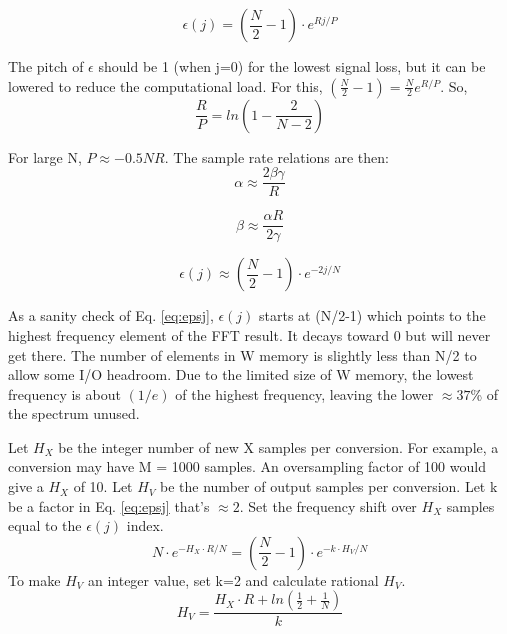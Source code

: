\begin{equation} \label{eq:eps_j}
\epsilon(j) = \left(\frac{N}{2}-1\right)\cdot e^{Rj/P}
\end{equation}

The pitch of $\epsilon$ should be 1 (when j=0) for the lowest signal loss,
but it can be lowered to reduce the computational load.
For this, $(\frac{N}{2}-1) = \frac{N}{2} e^{R/P}$. So,
\begin{equation} \label{eq:p}
\frac{R}{P} = ln\left(1 - \frac{2}{N-2}\right)
\end{equation}

For large N, $P \approx -0.5 NR$. The sample rate relations are then:
\begin{equation}
\alpha \approx \frac{2\beta\gamma}{R}
\end{equation}

\begin{equation}
\beta \approx \frac{\alpha R}{2\gamma}
\end{equation}

\begin{equation}  \label{eq:epsj}
\epsilon(j) \approx \left(\frac{N}{2}-1\right)\cdot e^{-2j/N}
\end{equation}

As a sanity check of Eq. \ref{eq:epsj}, $\epsilon(j)$ starts at (N/2-1) which
points to the highest frequency element of the FFT result.
It decays toward 0 but will never get there.
The number of elements in W memory is slightly less than N/2 to allow some I/O
headroom. Due to the limited size of W memory,
the lowest frequency is about $(1/e)$ of the highest frequency,
leaving the lower $\approx37$\% of the spectrum unused.

Let $H_X$ be the integer number of new X samples per conversion.
For example, a conversion may have M = 1000 samples.
An oversampling factor of 100 would give a $H_X$ of 10.
Let $H_V$ be the number of output samples per conversion.
Let k be a factor in Eq. \ref{eq:epsj} that's $\approx 2$.
Set the frequency shift over $H_X$ samples equal to the $\epsilon(j)$ index.
\begin{equation}
N\cdot e^{-H_X\cdot R/N} = \left(\frac{N}{2}-1\right)\cdot e^{-k \cdot H_V/N}
\end{equation}
To make $H_V$ an integer value, set k=2 and calculate rational $H_V$.
\begin{equation}
H_V = \frac{H_X \cdot R + ln\left(\frac{1}{2} + \frac{1}{N}\right)}{k}
\end{equation}

